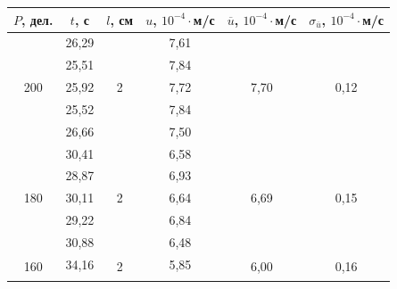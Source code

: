 \documentclass[a4paper, 12pt]{article}
\begin{document}
        \begin{table}[H]
            \centering
            \begin{tabular}{|c|ccccc|}
            \hline
            $P$, дел. & \multicolumn{1}{c|}{$t$, с} & \multicolumn{1}{c|}{$l$, см} & \multicolumn{1}{c|}{$u$, $10^{-4} \cdot$м/с} & \multicolumn{1}{c|}{$\overline{u}$, $10^{-4} \cdot$м/с} & $\sigma_{\overline{u}}$, $10^{-4} \cdot$м/с \\ \hline
            \multirow{5}{*}{200} & \multicolumn{1}{c|}{26,29} & \multicolumn{1}{c|}{\multirow{5}{*}{2}} & \multicolumn{1}{c|}{7,61} & \multicolumn{1}{c|}{\multirow{5}{*}{7,70}} & \multirow{5}{*}{0,12} \\ \cline{2-2} \cline{4-4}
             & \multicolumn{1}{c|}{25,51} & \multicolumn{1}{c|}{} & \multicolumn{1}{c|}{7,84} & \multicolumn{1}{c|}{} &  \\ \cline{2-2} \cline{4-4}
             & \multicolumn{1}{c|}{25,92} & \multicolumn{1}{c|}{} & \multicolumn{1}{c|}{7,72} & \multicolumn{1}{c|}{} &  \\ \cline{2-2} \cline{4-4}
             & \multicolumn{1}{c|}{25,52} & \multicolumn{1}{c|}{} & \multicolumn{1}{c|}{7,84} & \multicolumn{1}{c|}{} &  \\ \cline{2-2} \cline{4-4}
             & \multicolumn{1}{c|}{26,66} & \multicolumn{1}{c|}{} & \multicolumn{1}{c|}{7,50} & \multicolumn{1}{c|}{} &  \\ \hline
            \multirow{5}{*}{180} & \multicolumn{1}{c|}{30,41} & \multicolumn{1}{c|}{\multirow{5}{*}{2}} & \multicolumn{1}{c|}{6,58} & \multicolumn{1}{c|}{\multirow{5}{*}{6,69}} & \multirow{5}{*}{0,15} \\ \cline{2-2} \cline{4-4}
             & \multicolumn{1}{c|}{28,87} & \multicolumn{1}{c|}{} & \multicolumn{1}{c|}{6,93} & \multicolumn{1}{c|}{} &  \\ \cline{2-2} \cline{4-4}
             & \multicolumn{1}{c|}{30,11} & \multicolumn{1}{c|}{} & \multicolumn{1}{c|}{6,64} & \multicolumn{1}{c|}{} &  \\ \cline{2-2} \cline{4-4}
             & \multicolumn{1}{c|}{29,22} & \multicolumn{1}{c|}{} & \multicolumn{1}{c|}{6,84} & \multicolumn{1}{c|}{} &  \\ \cline{2-2} \cline{4-4}
             & \multicolumn{1}{c|}{30,88} & \multicolumn{1}{c|}{} & \multicolumn{1}{c|}{6,48} & \multicolumn{1}{c|}{} &  \\ \hline
            \multirow{5}{*}{160} & \multicolumn{1}{c|}{34,16} & \multicolumn{1}{c|}{\multirow{5}{*}{2}} & \multicolumn{1}{c|}{5,85} & \multicolumn{1}{c|}{\multirow{5}{*}{6,00}} & \multirow{5}{*}{0,16} \\ \cline{2-2} \cline{4-4}

\end{tabular}
\end{table}
\end{document}
